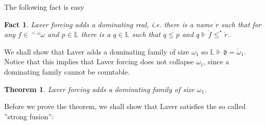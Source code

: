 \documentclass[a4paper,11pt,oneside]{mybook}
\def\force{\Vdash}
\theoremstyle{theorem}
\newtheorem{theorem}[subsection]{Theorem}
\newtheorem{fact}[subsection]{Fact}
\theoremstyle{example}
\begin{document}
The following fact is easy

\begin{fact} Laver forcing adds a dominating real, i.e. there is a name $\dot{r}$ such that for any $f\in{}^{<\omega}\omega$ and $p\in\mathbb{L}$
there is a $q\in\mathbb{L}$ such that $q\leq p$ and $q\force \check{f}\leq^* \dot{r}$.
\end{fact}

We shall show that Laver adds a dominating family of size $\omega_1$ so $\mathbb{L}\force\mathfrak{d}=\check{\omega}_1$. Notice that this implies that
Laver forcing does not collapse $\omega_1$, since a dominating family cannot be countable.


\begin{theorem}\label{dominating-family} Laver forcing adds a dominating family of size $\omega_1$.
\end{theorem}

Before we prove the theorem, we shall show that Laver satisfies the so called ''strong fusion'':
\end{document}
